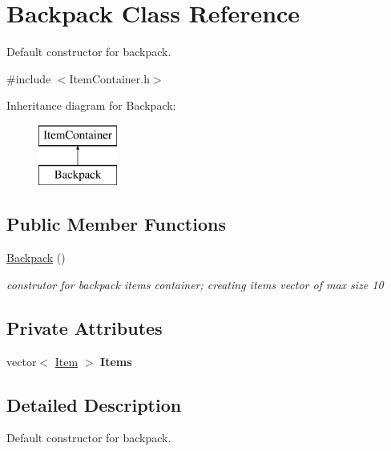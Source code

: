 \hypertarget{class_backpack}{}\section{Backpack Class Reference}
\label{class_backpack}


Default constructor for backpack.  




{\ttfamily \#include $<$Item\+Container.\+h$>$}

Inheritance diagram for Backpack\+:\begin{figure}[H]
\begin{center}
\leavevmode
\includegraphics[height=2.000000cm]{class_backpack}
\end{center}
\end{figure}
\subsection*{Public Member Functions}
\begin{DoxyCompactItemize}
\item 
\hypertarget{class_backpack_ac6b173af910a41f0e9b687b7252d236c}{}\label{class_backpack_ac6b173af910a41f0e9b687b7252d236c} 
\hyperlink{class_backpack_ac6b173af910a41f0e9b687b7252d236c}{Backpack} ()
\begin{DoxyCompactList}\small\item\em construtor for backpack items container; creating items vector of max size 10 \end{DoxyCompactList}\end{DoxyCompactItemize}
\subsection*{Private Attributes}
\begin{DoxyCompactItemize}
\item 
\hypertarget{class_backpack_aa717805ae2d71a87746ee00592d5f80f}{}\label{class_backpack_aa717805ae2d71a87746ee00592d5f80f} 
vector$<$ \hyperlink{class_item}{Item} $>$ {\bfseries Items}
\end{DoxyCompactItemize}


\subsection{Detailed Description}
Default constructor for backpack. 


